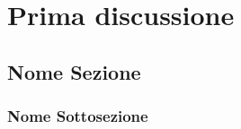 \documentclass[main.tex]{subfiles}
\begin{document}
\chapter{Prima discussione}
\section{Nome Sezione}
\subsection{Nome Sottosezione}
\end{document}
